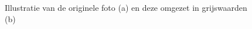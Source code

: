 \documentclass[a4paper,kulak]{kulakarticle}
\begin{document}
\begin{figure}[H]
	\centering
	
	\caption{Illustratie van de originele foto (a) en deze omgezet in grijswaarden (b)}
	\label{figuur beste_treshold}
\end{figure}
\end{document}
